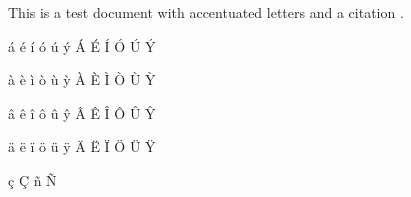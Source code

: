 \documentclass{article}
\begin{document}
This is a test document with accentuated letters and a citation \cite{key}.

\'a \'e \'i \'o \'u \'y \'A \'E \'I \'O \'U \'Y

\`a \`e \`i \`o \`u \`y \`A \`E \`I \`O \`U \`Y

\^a \^e \^i \^o \^u \^y \^A \^E \^I \^O \^U \^Y

\"a \"e \"i \"o \"u \"y \"A \"E \"I \"O \"U \"Y

\c c \c C \~n \~N



\end{document}
